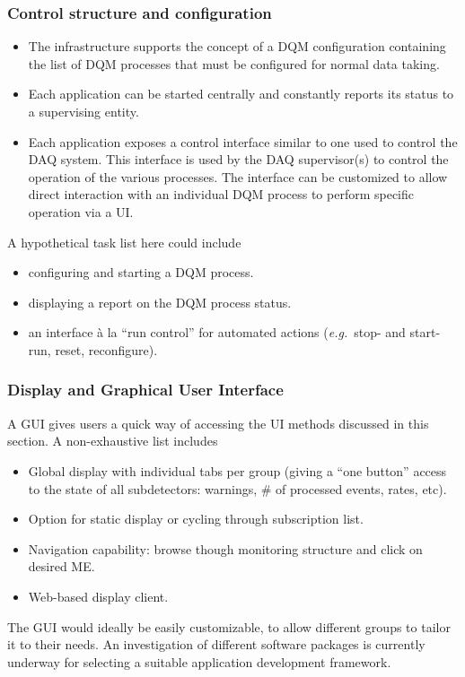 \documentclass{cmspaper}
\newcommand {\eg}{\mbox{\sl e.g. }}     %
\begin{document}
\subsubsection{Control structure and configuration}
\label{sec:control_structure}
\begin{itemize}
\item{The infrastructure supports the concept of a DQM configuration
containing the list of DQM processes that must be configured  for normal
data taking.}
\item{Each application can be started centrally and constantly
reports its status to a supervising entity.}
\item{Each application exposes a control interface similar to one used to
control the DAQ system. This interface is used  by the DAQ supervisor(s) to
control the operation of the various processes. The interface can be
customized to allow direct interaction with an individual DQM process to
perform specific  operation via a UI.}
\end{itemize}
%
A hypothetical task list here could include
\begin{itemize}
\item{configuring and starting a DQM process.}
\item{displaying a report on the DQM process status.}
\item{an interface \`a la ``run control'' for automated actions
(\eg stop- and start-run, reset, reconfigure).}
\end{itemize}
%
%
\subsubsection{Display and Graphical User Interface}
A GUI gives users a quick way of accessing the UI methods discussed in
this section. A non-exhaustive list includes
\begin{itemize}
\item{Global display with individual tabs per group (giving a ``one button''
access to the state of all subdetectors: warnings, \# of processed
events, rates, etc).}
\item{Option for static display or cycling through subscription list.}
\item{Navigation capability: browse though monitoring structure and click
on desired ME.}
\item{Web-based display client.}
\end{itemize}
%
The GUI would ideally be easily customizable, to allow different
groups to tailor it to their needs. An investigation of different
software packages is currently underway for selecting a
suitable application development framework.
%
%
\newpage
\appendix 
\bigskip
\end{document}
